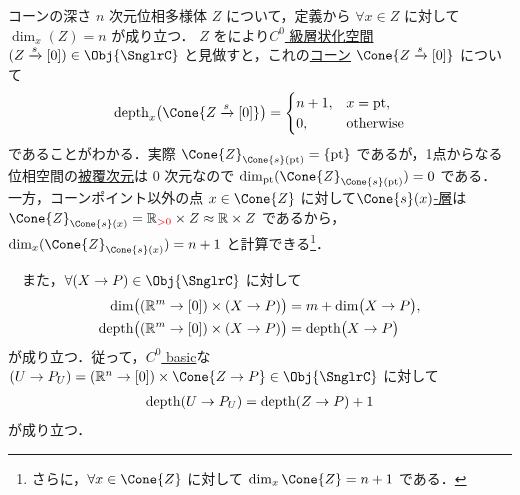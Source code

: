 \documentclass[TQFT_main]{subfiles}
\begin{document}
\begin{myexample}[label=ex:depth-Cone]{コーンの深さ}
    $n$ 次元位相多様体 $Z$ について，定義から $\forall x \in Z$ に対して $\dim_x(Z) = n$ が成り立つ．
    $Z$ をにより\hyperref[def:Snglr-C0]{$C^0$ 級層状化空間} $(Z \xrightarrow{s} [0]) \in \Obj{\SnglrC}$ と見做すと，これの\hyperref[def:str-cone]{コーン} $\Cone{Z \xrightarrow{s} [0]}$ について
    \begin{align}
        \depth_x \bigl( \Cone{Z \xrightarrow{s} [0]} \bigr) 
        =
        \begin{cases}
            n+1, &x = \mathrm{pt}, \\
            0, &\text{otherwise}
        \end{cases}
    \end{align}
    であることがわかる．実際 $\Cone{Z}_{\Cone{s}(\mathrm{pt})} = \{\mathrm{pt}\}$ であるが，1点からなる位相空間の\hyperref[def:covering-dim]{被覆次元}は $0$ 次元なので $\dim_{\mathrm{pt}} (\Cone{Z}_{\Cone{s}(\mathrm{pt})}) = 0$ である．
    一方，コーンポイント以外の点 $x \in \Cone{Z}$ に対して\hyperref[def:stratified-space]{$\Cone{s}(x)$-層}は
    $\Cone{Z}_{\Cone{s}(x)} = \mathbb{R}_{\textcolor{red}{> 0}} \times Z \approx \mathbb{R} \times Z$ であるから，
    $\dim_{x} (\Cone{Z}_{\Cone{s}(x)}) = n + 1$ と計算できる\footnote{さらに，$\forall x \in \Cone{Z}$ に対して $\dim_{x} \Cone{Z} = n+1$ である．}．
    
    　また，$\forall (X \to P) \in \Obj{\SnglrC}$ に対して
    \begin{align}
        \dim \bigl( (\mathbb{R}^m \to [0]) \times (X \to P) \bigr) &= m + \dim \bigl( X \to P \bigr), \\
        \operatorname{depth} \bigl( (\mathbb{R}^m \to [0]) \times (X \to P) \bigr) &= \operatorname{depth} \bigl( X \to P \bigr) 
    \end{align}
    が成り立つ．従って，\hyperref[def:C0-basic]{$C^0$ basic}な $(U \to P_U) = (\mathbb{R}^n \to [0]) \times \Cone{Z \to P} \in \Obj{\SnglrC}$ に対して
    \begin{align}
        \operatorname{depth} (U \to P_U) = \operatorname{depth} (Z \to P) + 1
    \end{align}
    が成り立つ．
\end{myexample}
\end{document}
